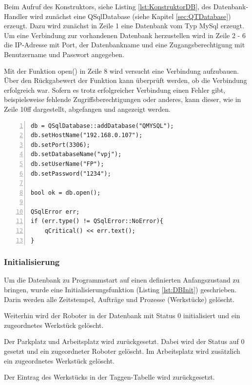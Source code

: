 Beim Aufruf des Konstruktors, siehe Listing \ref{lst:KonstruktorDB}, des Datenbank-Handler wird zunächst eine QSqlDatabase (siehe Kapitel \ref{sec:QTDatabase}) erzeugt. Dazu wird zunächst in Zeile 1 eine Datenbank vom Typ MySql erzeugt. Um eine Verbindung zur vorhandenen Datenbank herzustellen wird in Zeile 2 - 6 die IP-Adresse mit Port, der Datenbankname und eine Zugangsberechtigung mit Benutzername und Passwort angegeben. 

Mit der Funktion open() in Zeile 8 wird versucht eine Verbindung aufzubauen. Über den Rückgabewert der Funktion kann überprüft werden, ob die Verbindung erfolgreich war. Sofern es trotz erfolgreicher Verbindung einen Fehler gibt, beispielsweise fehlende Zugriffsberechtigungen oder anderes, kann dieser, wie in Zeile 10ff dargestellt, abgefangen und angezeigt werden. 

\begin{lstlisting}[frame=single, breaklines=true, numbers=left, stepnumber=2, firstnumber=1, numberstyle = \tiny, caption=Databank-Handler Konstruktor ,label=lst:KonstruktorDB]
db = QSqlDatabase::addDatabase("QMYSQL");
db.setHostName("192.168.0.107");
db.setPort(3306);
db.setDatabaseName("vpj");
db.setUserName("FP");
db.setPassword("1234");

bool ok = db.open();

QSqlError err;
if (err.type() != QSqlError::NoError){
    qCritical() << err.text();
}
\end{lstlisting}

\subsubsection{Initialisierung}

Um die Datenbank zu Programmstart auf einen definierten Anfangszustand zu bringen, wurde eine Initialisierungsfunktion (Listing \ref{lst:DBInit}) geschrieben. Darin werden alle Zeitstempel, Aufträge und Prozesse (Werkstücke) gelöscht. 

Weiterhin wird der Roboter in der Datenbank mit Status 0 initialisiert und ein zugeordnetes Werkstück gelöscht. 

Der Parkplatz und Arbeitsplatz wird zurückgesetzt. Dabei wird der Status auf 0 gesetzt und ein zugeordneter Roboter gelöscht. Im Arbeitsplatz wird zusätzlich ein zugeordnetes Werkstück gelöscht.

Der Eintrag des Werkstücks in der Taggen-Tabelle wird zurückgesetzt.


